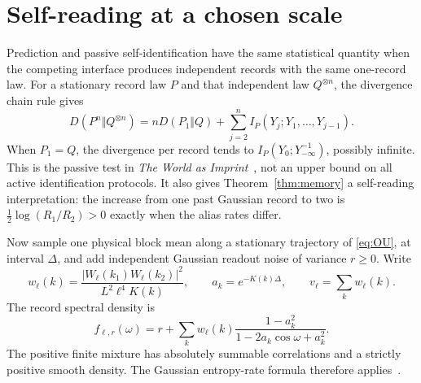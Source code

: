 \documentclass[12pt,a4paper]{article}
\begin{document}
\section{Self-reading at a chosen scale}\label{sec:self-scale}

Prediction and passive self-identification have the same statistical
quantity when the competing interface produces independent records
with the same one-record law. For a stationary record law $P$ and
that independent law $Q^{\otimes n}$, the divergence chain rule gives
\begin{equation}\label{eq:predictive-rate}
 D(P^n\Vert Q^{\otimes n})=
 nD(P_1\Vert Q)+\sum_{j=2}^n I_P(Y_j;Y_1,\ldots,Y_{j-1}).
\end{equation}
When $P_1=Q$, the divergence per record tends to
$I_P(Y_0;Y_{-\infty}^{-1})$, possibly infinite. This is the passive
test in \emph{The World as Imprint}~\cite{WorldImprint}, not an upper
bound on all active identification protocols. It also gives
Theorem~\ref{thm:memory} a self-reading interpretation: the increase
from one past Gaussian record to two is
$\frac12\log(R_1/R_2)>0$ exactly when the alias rates differ.

Now sample one physical block mean along a stationary trajectory of
\eqref{eq:OU}, at interval $\Delta$, and add independent Gaussian
readout noise of variance $r\geq0$. Write
\[
 w_\ell(k)=\frac{|W_\ell(k_1)W_\ell(k_2)|^2}
 {L^2\ell^4K(k)},\qquad a_k=e^{-K(k)\Delta},\qquad
 v_\ell=\sum_k w_\ell(k).
\]
The record spectral density is
\begin{equation}\label{eq:reading-density}
 f_{\ell,r}(\omega)=r+\sum_k w_\ell(k)
 \frac{1-a_k^2}{1-2a_k\cos\omega+a_k^2}.
\end{equation}
The positive finite mixture has absolutely summable correlations and
a strictly positive smooth density. The Gaussian entropy-rate formula
therefore applies~\cite{Gray2006}.
\end{document}
